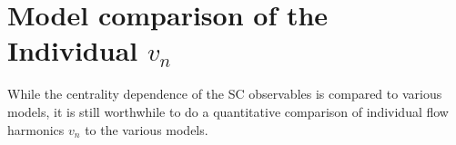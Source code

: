 \newpage

\appendix
\section{Model comparison of the Individual $v_n$}

While the centrality dependence of the SC observables is compared to various models, it is still worthwhile to do a quantitative comparison of individual flow harmonics $v_n$ to the various models.

\begin{figure}[h]
            \begin{center}

\end{center}
\end{figure}
